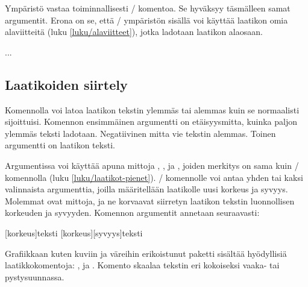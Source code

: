 Ympäristö  vastaa toiminnallisesti
\-/ komentoa. Se hyväksyy täsmälleen samat argumentit.
Erona on se, että \-/ ympäristön sisällä voi käyttää
laatikon omia alaviitteitä (luku \ref{luku/alaviitteet}), jotka ladotaan
laatikon alaosaan.

\begin{koodilohkosis}
\begin{minipage}[sijainti][korkeus][sisäsijainti]{leveys}
  ...
\end{minipage}
\end{koodilohkosis}

\subsection{Laatikoiden siirtely}

Komennolla  voi latoa laatikon tekstin ylemmäs tai
alemmas kuin se normaalisti sijoittuisi. Komennon ensimmäinen argumentti
on etäisyysmitta, kuinka paljon ylemmäs teksti ladotaan. Negatiivinen
mitta vie tekstin alemmas. Toinen argumentti on laatikon teksti.

\begin{koodilohkosis}
\raisebox{etäisyysmitta}{teksti}
\end{koodilohkosis}

\noindent
Argumentissa  voi käyttää apuna mittoja
, ,  ja ,
joiden merkitys on sama kuin \-/ komennolla (luku
\ref{luku/laatikot-pienet}). \-/ komennolle voi antaa
yhden tai kaksi valinnaista argumenttia, joilla määritellään laatikolle
uusi korkeus ja syvyys. Molemmat ovat mittoja, ja ne korvaavat siirretyn
laatikon tekstin luonnollisen korkeuden ja syvyyden. Komennon argumentit
annetaan seuraavasti:

\begin{koodilohkosis}
\raisebox{etäisyysmitta}[korkeus]{teksti}
\raisebox{etäisyysmitta}[korkeus][syvyys]{teksti}
\end{koodilohkosis}

\noindent
Grafiikkaan kuten kuviin ja väreihin erikoistunut paketti
 sisältää hyödyllisiä laatikkokomentoja:
,  ja . Komento
 skaalaa tekstin eri kokoiseksi vaaka- tai
pystysuunnassa.

